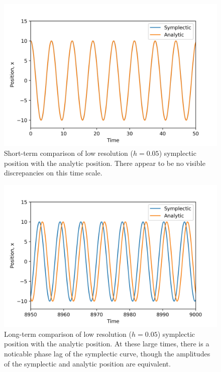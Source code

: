 \documentclass{article}
\begin{document}
\begin{figure}[H]
\includegraphics[width=\textwidth]{offset1.jpg}
\caption{Short-term comparison of low resolution ($h=0.05$) symplectic position with the analytic position. There appear to be no visible discrepancies on this time scale.}
\end{figure}

\begin{figure}[H]
\includegraphics[width=\textwidth]{offset2.jpg}
\caption{Long-term comparison of low resolution ($h=0.05$) symplectic position with the analytic position. At these large times, there is a noticable phase lag of the symplectic curve, though the amplitudes of the symplectic and analytic position are equivalent.}
\end{figure}
\end{document}
